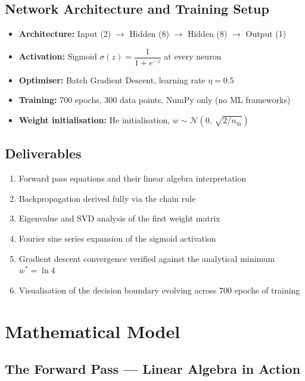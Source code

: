 \documentclass[12pt,a4paper]{article}
\begin{document}
\subsection{Network Architecture and Training Setup}

\begin{itemize}[leftmargin=2em, itemsep=3pt]
  \item \textbf{Architecture:} Input (2) $\to$ Hidden (8) $\to$ Hidden (8) $\to$ Output (1)
  \item \textbf{Activation:} Sigmoid $\sigma(z) = \dfrac{1}{1+e^{-z}}$ at every neuron
  \item \textbf{Optimiser:} Batch Gradient Descent, learning rate $\eta = 0.5$
  \item \textbf{Training:} 700 epochs, 300 data points, NumPy only (no ML frameworks)
  \item \textbf{Weight initialisation:} He initialisation, $w \sim \mathcal{N}\!\left(0,\, \sqrt{2/n_{\mathrm{in}}}\right)$
\end{itemize}

\subsection{Deliverables}

\begin{enumerate}[leftmargin=2em, itemsep=3pt]
  \item Forward pass equations and their linear algebra interpretation
  \item Backpropagation derived fully via the chain rule
  \item Eigenvalue and SVD analysis of the first weight matrix
  \item Fourier sine series expansion of the sigmoid activation
  \item Gradient descent convergence verified against the analytical minimum $w^* = \ln 4$
  \item Visualisation of the decision boundary evolving across 700 epochs of training
\end{enumerate}

\newpage

\section{Mathematical Model}

\subsection{The Forward Pass --- Linear Algebra in Action}
\end{document}

